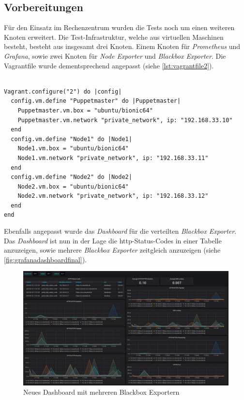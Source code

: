 \documentclass[titlepage]{report}
\begin{document}
\subsection{Vorbereitungen}
Für den Einsatz im Rechenzentrum wurden die Tests noch um einen weiteren
Knoten erweitert. Die Test\hyp{}Infrastruktur, welche aus virtuellen
Maschinen besteht, besteht aus insgesamt drei Knoten. Einem Knoten
für \emph{Prometheus} und \emph{Grafana}, sowie zwei Knoten für
\emph{Node Exporter} und \emph{Blackbox Exporter}. Die Vagrantfile wurde
dementsprechend angepasst (siehe \autoref{lst:vagrantfile2}).
\begin{minipage}{\linewidth}
\begin{lstlisting}[caption={Neue Vagrantfile für Tests vor dem
Deployment},label={lst:vagrantfile2}]

Vagrant.configure("2") do |config|
  config.vm.define "Puppetmaster" do |Puppetmaster|
    Puppetmaster.vm.box = "ubuntu/bionic64"
    Puppetmaster.vm.network "private_network", ip: "192.168.33.10"
  end
  config.vm.define "Node1" do |Node1|
    Node1.vm.box = "ubuntu/bionic64"
    Node1.vm.network "private_network", ip: "192.168.33.11"
  end
  config.vm.define "Node2" do |Node2|
    Node2.vm.box = "ubuntu/bionic64"
    Node2.vm.network "private_network", ip: "192.168.33.12"
  end
end
\end{lstlisting}
\end{minipage}
Ebenfalls angepasst wurde das \emph{Dashboard} für die verteilten
\emph{Blackbox Exporter}. Das \emph{Dashboard} ist nun in der Lage die
\gls{http}\hyp{}Status\hyp{}Codes in einer Tabelle anzuzeigen, sowie
mehrere \emph{Blackbox Exporter} zeitgleich anzuzeigen (siehe
\autoref{fig:grafanadashboardfinal}).
\begin{figure}[H]
    \centering
    \includegraphics[width=1.0\textwidth]{figures/grafana_dashboard_final.png}
    \caption{Neues Dashboard mit mehreren Blackbox
    Exportern}\label{fig:grafanadashboardfinal}
\end{figure}
\end{document}
